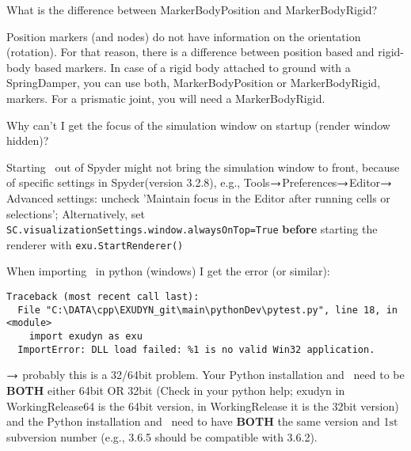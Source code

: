 	\ei
  \item What is the difference between MarkerBodyPosition and MarkerBodyRigid?
	\bi
	\item[$\ra$] Position markers (and nodes) do not have information on the orientation (rotation). For that reason, there is a difference between position based and rigid-body based markers. In case of a rigid body attached to ground with a SpringDamper, you can use both, MarkerBodyPosition or MarkerBodyRigid, markers. For a prismatic joint, you will need a MarkerBodyRigid.
	\ei
  \item Why can't I get the focus of the simulation window on startup (render window hidden)?
	\bi
	\item[$\ra$] Starting \codeName\ out of Spyder might not bring the simulation window to front, because of specific settings in Spyder(version 3.2.8), e.g., Tools$\ra$Preferences$\ra$Editor$\ra$Advanced settings: uncheck 'Maintain focus in the Editor after running cells or selections'; Alternatively, set \texttt{SC.visualizationSettings.window.alwaysOnTop=True} {\bf before} starting the renderer with \texttt{exu.StartRenderer()}
	\ei
  \item When importing \codeName\ in python (windows) I get the error (or similar):\\
{\ttfamily \footnotesize
\begin{lstlisting}[breaklines=true]
Traceback (most recent call last):
  File "C:\DATA\cpp\EXUDYN_git\main\pythonDev\pytest.py", line 18, in <module>
    import exudyn as exu
  ImportError: DLL load failed: %1 is no valid Win32 application.
\end{lstlisting}}
	$\ra$ probably this is a 32/64bit problem. Your Python installation and \codeName\ need to be {\bf BOTH} either 64bit OR 32bit (Check in your python help; exudyn in WorkingRelease64 is the 64bit version, in WorkingRelease it is the 32bit version) and the Python installation and \codeName\ need to have {\bf BOTH} the same version and 1$\mathrm{st}$ subversion number (e.g., 3.6.5 should be compatible with 3.6.2).
\en


